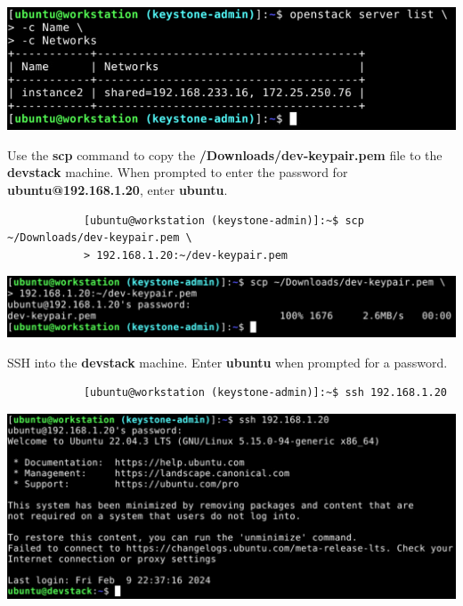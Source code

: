 \documentclass[letterpaper, 12pt]{article}
\begin{document}
\begin{enumerate}
\begin{labstep}
        \begin{center}
            \includegraphics[width=\linewidth]{images/part3/step7.png}
        \end{center}
    \end{labstep}

    \begin{labstep}
        Use the \textbf{scp} command to copy the \textbf{\texttildemid/Downloads/dev-keypair.pem} file to the \textbf{devstack} machine.
        When prompted to enter the password for \textbf{ubuntu@192.168.1.20}, enter \textbf{ubuntu}.
        \begin{lstlisting}
            [ubuntu@workstation (keystone-admin)]:~$ scp ~/Downloads/dev-keypair.pem \
            > 192.168.1.20:~/dev-keypair.pem
        \end{lstlisting}

        \begin{center}
            \includegraphics[width=\linewidth]{images/part3/step8.png}
        \end{center}
    \end{labstep}

    \begin{labstep}
        SSH into the \textbf{devstack} machine.
        Enter \textbf{ubuntu} when prompted for a password.
        \begin{lstlisting}
            [ubuntu@workstation (keystone-admin)]:~$ ssh 192.168.1.20
        \end{lstlisting}

        \begin{center}
            \includegraphics[width=\linewidth]{images/part3/step9.png}
        \end{center}
    \end{labstep}


\end{enumerate}
\end{document}
